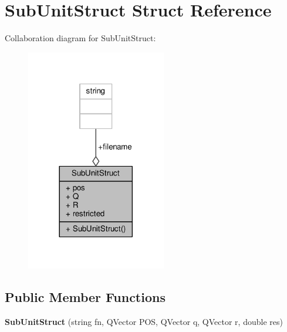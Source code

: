 \hypertarget{structSubUnitStruct}{}\section{Sub\+Unit\+Struct Struct Reference}
\label{structSubUnitStruct}


Collaboration diagram for Sub\+Unit\+Struct\+:
\nopagebreak
\begin{figure}[H]
\begin{center}
\leavevmode
\includegraphics[width=173pt]{d8/d0f/structSubUnitStruct__coll__graph}
\end{center}
\end{figure}
\subsection*{Public Member Functions}
\begin{DoxyCompactItemize}
\item 
{\bfseries Sub\+Unit\+Struct} (string fn, Q\+Vector P\+OS, Q\+Vector q, Q\+Vector r, double res)\hypertarget{structSubUnitStruct_a4a8920364f7caff7402317c5c5fd9aae}{}\label{structSubUnitStruct_a4a8920364f7caff7402317c5c5fd9aae}

\end{DoxyCompactItemize}
